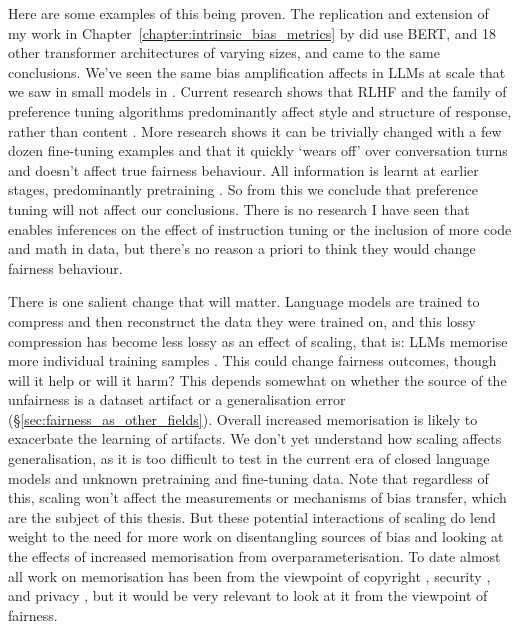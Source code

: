 Here are some examples of this being proven. The replication and extension of my work in Chapter~\ref{chapter:intrinsic_bias_metrics} by \citet{cao-etal-2022-intrinsic} did use BERT, and 18 other transformer architectures of varying sizes, and came to the same conclusions. We've seen the same bias amplification affects in LLMs at scale \citep{article} that we saw in small models in \citet{zhao-etal-2017-men}. Current research shows that RLHF and the family of preference tuning algorithms predominantly affect style and structure of response, rather than content \citep{min-etal-2022-rethinking,  lin2023unlocking}. More research shows it can be trivially changed with a few dozen fine-tuning examples \citep{qi2023finetuning} and that it quickly `wears off' over conversation turns \citep{llama2} and doesn't affect true fairness behaviour. All information is learnt at earlier stages, predominantly pretraining \citep{zhou2023lima}. So from this we conclude that preference tuning will not affect our conclusions. There is no research I have seen that enables inferences on the effect of instruction tuning or the inclusion of more code and math in data, but there's no reason a priori to think they would change fairness behaviour.  

There is one salient change that will matter. Language models are trained to compress and then reconstruct the data they were trained on, and this lossy compression has become less lossy as an effect of scaling, that is: LLMs memorise more individual training samples \citep{karamolegkou-etal-2023-copyright}. This could change fairness outcomes, though will it help or will it harm? This depends somewhat on whether the source of the unfairness is a dataset artifact or a generalisation error (\S \ref{sec:fairness_as_other_fields}). Overall increased memorisation is likely to exacerbate the learning of artifacts. We don't yet understand how scaling affects generalisation, as it is too difficult to test in the current era of closed language models and unknown pretraining and fine-tuning data. Note that regardless of this, scaling won't affect the measurements or mechanisms of bias transfer, which are the subject of this thesis. But these potential interactions of scaling do lend weight to the need for more work on disentangling sources of bias and looking at the effects of increased memorisation from overparameterisation. To date almost all work on memorisation has been from the viewpoint of copyright \citep{}, security \citep{}, and privacy \citep{}, but it would be very relevant to look at it from the viewpoint of fairness.
 
